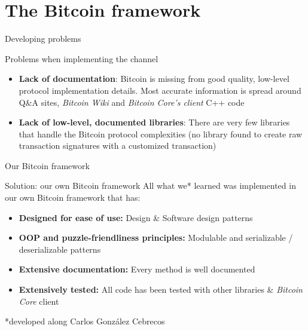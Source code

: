 \documentclass{beamer}
\begin{document}
\section{The Bitcoin framework}
\begin{frame}{Developing problems}
 \begin{alertblock}{Problems when implementing the channel}
  \begin{itemize}
   \item \textbf{Lack of documentation}: Bitcoin is missing from good quality, low-level protocol implementation details. Most accurate information is spread around Q\&A sites, \textit{Bitcoin Wiki} and \textit{Bitcoin Core's client} C++ code
   \item \textbf{Lack of low-level, documented libraries}: There are very few libraries that handle the Bitcoin protocol complexities (no library found to create raw transaction signatures with a customized transaction)
  \end{itemize}
 \end{alertblock}
\end{frame}
\begin{frame}{Our Bitcoin framework}
 \begin{exampleblock}{Solution: our own Bitcoin framework}
  All what we* learned was implemented in our own Bitcoin framework that has:
  \begin{itemize}
   \item \textbf{Designed for ease of use:} Design \& Software design patterns
   \item \textbf{OOP and puzzle-friendliness principles:} Modulable and serializable / deserializable patterns
   \item \textbf{Extensive documentation:} Every method is well documented
   \item \textbf{Extensively tested:} All code has been tested with other libraries \& \textit{Bitcoin Core} client
  \end{itemize}
 \end{exampleblock}
 \begin{center}
  *developed along Carlos González Cebrecos
 \end{center}
\end{frame}
\end{document}
